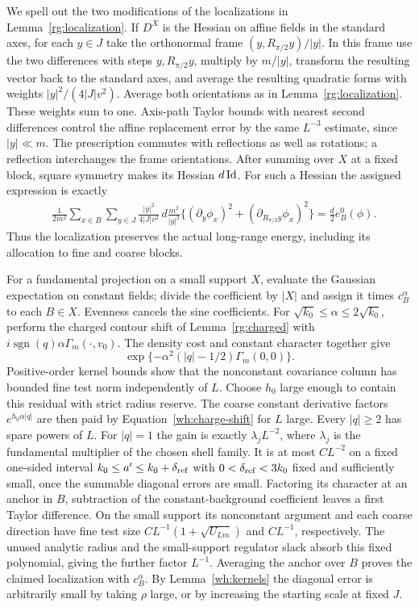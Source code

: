 We spell out the two modifications of the localizations in
Lemma~\ref{rg:localization}.  If $D^X$ is the Hessian on affine fields
in the standard axes, for each $y\in J$ take the orthonormal frame
$(y,R_{\pi/2}y)/|y|$.  In this frame use the two differences with
steps $y,R_{\pi/2}y$, multiply by $m/|y|$, transform the resulting
vector back to the standard axes, and average the resulting quadratic
forms with weights $|y|^2/(4|J|v^2)$.  Average both orientations as
in Lemma~\ref{rg:localization}.  These weights sum to one.  Axis-path
Taylor bounds with nearest second differences control the affine
replacement error by the same $L^{-3}$ estimate, since $|y|\ll m$.
The prescription commutes with reflections as well as rotations;
a reflection interchanges the frame orientations.  After summing
over $X$ at a fixed block, square symmetry makes its Hessian $d\operatorname{Id}$.
For such a Hessian the assigned expression is exactly
\begin{align*}
 &\frac1{2m^2}\sum_{x\in B}\sum_{y\in J}
  \frac{|y|^2}{4|J|v^2}\,d\frac{m^2}{|y|^2}
    \{(\partial_y\phi_x)^2+(\partial_{R_{\pi/2}y}\phi_x)^2\}
       =\frac d2 e_B^0(\phi).
\end{align*}
Thus the localization preserves the actual long-range energy,
including its allocation to fine and coarse blocks.

For a fundamental projection on a small support $X$, evaluate the
Gaussian expectation on constant fields; divide the coefficient by
$|X|$ and assign it times $c_B^\alpha$ to each $B\in X$.
Evenness cancels the sine coefficients.  For
$\sqrt{k_0}\le\alpha\le2\sqrt{k_0}$, perform the charged contour shift
of Lemma~\ref{rg:charged} with
$i\operatorname{sgn}(q)\alpha\Gamma_m(\cdot,v_0)$.
The density cost and constant character together give
\begin{equation}\label{wh:charge-shift}
 \exp\{-\alpha^2(|q|-1/2)\Gamma_m(0,0)\}.
\end{equation}
Positive-order kernel bounds show that the nonconstant covariance
column has bounded fine test norm independently of $L$.  Choose $h_0$
large enough to contain this residual with strict radius reserve.
The coarse constant derivative factors $e^{h_0\alpha|q|}$ are then
paid by Equation~\eqref{wh:charge-shift} for $L$ large.  Every
$|q|\ge2$ has spare powers of $L$.  For $|q|=1$ the gain is exactly
$\lambda_jL^{-2}$, where $\lambda_j$ is the fundamental multiplier
of the chosen shell family.  It is at most $CL^{-2}$ on a fixed
one-sided interval $k_0\le a'\le k_0+\delta_{\rm ref}$ with
$0<\delta_{\rm ref}<3k_0$ fixed and sufficiently small, once the
summable diagonal errors are small.  Factoring its character at an
anchor in $B$, subtraction
of the constant-background coefficient leaves a first Taylor
difference.  On the small support its nonconstant argument and each
coarse direction have fine test size
$CL^{-1}(1+\sqrt{U_{Lm}})$ and $CL^{-1}$, respectively.  The unused
analytic radius and the small-support regulator slack absorb this
fixed polynomial, giving the further factor $L^{-1}$.  Averaging the
anchor over $B$ proves the claimed localization with $c_B^\alpha$.
By Lemma~\ref{wh:kernels} the diagonal error is arbitrarily small by
taking $\rho$ large, or by increasing the starting scale at fixed $J$.

